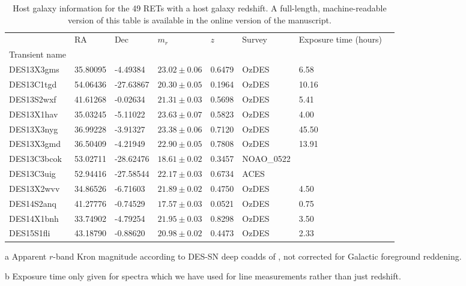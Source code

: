 \documentclass[fleqn,usenatbib,]{mnras}
\begin{document}
\begin{table}
\begin{center}
\caption{Host galaxy information for the 49 RETs with a host galaxy redshift. A full-length, machine-readable version of this table is available in the online version of the manuscript.}

\begin{threeparttable}
\begin{tabular}{llllllll}

\toprule
{} &       RA &       Dec &    $m_r$\tnote{a}  &     $z$ &     Survey & Exposure time (hours) \tnote{b} \\
Transient name &          &           &          &         &         &            &               \\
\midrule
DES13X3gms     & 35.80095 &  -4.49384 & $23.02 \pm 0.06$ & 0.6479 &      OzDES &       6.58 \\
DES13C1tgd     & 54.06436 & -27.63867 & $20.30 \pm 0.05$ & 0.1964 &      OzDES &      10.16 \\
DES13S2wxf     & 41.61268 &  -0.02634 & $21.31 \pm 0.03$ & 0.5698 &      OzDES &       5.41 \\
DES13X1hav     & 35.03245 &  -5.11022 & $23.63 \pm 0.07$ & 0.5823 &      OzDES &       4.00 \\
DES13X3nyg     & 36.99228 &  -3.91327 & $23.38 \pm 0.06$ & 0.7120 &      OzDES &      45.50 \\
DES13X3gmd     & 36.50409 &  -4.21949 & $22.90 \pm 0.05$ & 0.7808 &      OzDES &      13.91 \\
DES13C3bcok    & 53.02711 & -28.62476 & $18.61 \pm 0.02$ & 0.3457 &  NOAO\_0522 &               \\
DES13C3uig     & 52.94416 & -27.58544 & $22.17 \pm 0.03$ & 0.6734 &       ACES &               \\
DES13X2wvv     & 34.86526 &  -6.71603 & $21.89 \pm 0.02$ & 0.4750 &      OzDES &       4.50 \\
DES14S2anq     & 41.27776 &  -0.74529 & $17.57 \pm 0.03$ & 0.0521 &      OzDES &       0.75 \\
DES14X1bnh     & 33.74902 &  -4.79254 & $21.95 \pm 0.03$ & 0.8298 &      OzDES &       3.50 \\
DES15S1fli     & 43.18790 &  -0.88620 & $20.98 \pm 0.02$ & 0.4473 &      OzDES &       2.33 \\
\bottomrule
\end{tabular}
\begin{tablenotes}
\item[a] Apparent $r$-band Kron magnitude according to DES-SN deep coadds of \citet{Wiseman2020}, not corrected for Galactic foreground reddening.
\item[b] Exposure time only given for spectra which we have used for line measurements rather than just redshift.
\end{tablenotes}
\end{threeparttable}
\end{center}
\label{tab:obs}
\end{table}
\end{document}

